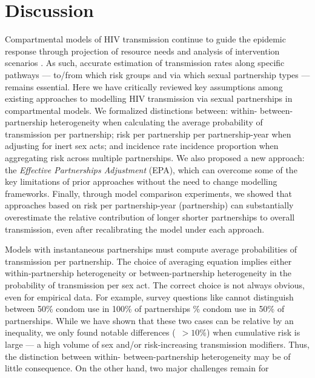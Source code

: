 \section{Discussion}\label{foi.disc}
Compartmental models of HIV transmission continue to guide the epidemic response
through projection of resource needs and analysis of intervention scenarios \cite{??}.
As such, accurate estimation of transmission rates along specific pathways
--- \ie to/from which risk groups and via which sexual partnership types --- remains essential.
Here we have critically reviewed key assumptions among existing approaches to
modelling HIV transmission via sexual partnerships in compartmental models.
We formalized distinctions between:
within- \vs between-partnership heterogeneity
when calculating the average probability of transmission per partnership;
risk per partnership \vs per partnership-year
when adjusting for inert sex acts; and
incidence rate \vs incidence proportion
when aggregating risk across multiple partnerships.
We also proposed a new approach: the \emph{Effective Partnerships Adjustment} (EPA),
which can overcome some of the key limitations of prior approaches
without the need to change modelling frameworks.
Finally, through model comparison experiments, we showed that
approaches based on risk per partnership-year (\vs partnership) can
substantially overestimate the relative contribution of
longer \vs shorter partnerships to overall transmission,
even after recalibrating the model under each approach.
\par %
Models with instantaneous partnerships must compute
average probabilities of transmission per partnership.
The choice of averaging equation implies either
within-partnership heterogeneity or between-partnership heterogeneity
in the probability of transmission per sex act.
The correct choice is not always obvious, even for empirical data.
For example, survey questions like
cannot distinguish between
50\% condom use in 100\% of partnerships \% condom use in 50\% of partnerships.
While we have shown that these two cases can be relative by an inequality,
we only found notable differences (\eg~$>10$\%) when cumulative risk is large
--- \eg a high volume of sex and/or risk-increasing transmission modifiers.
Thus, the distinction between within- \vs between-partnership heterogeneity
may be of little consequence.
On the other hand, two major challenges remain for
